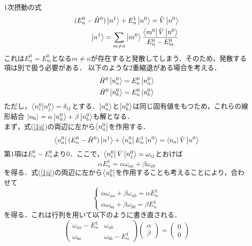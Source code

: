 \documentclass{standalone}
\begin{document}
  1次摂動の式
  \begin{align}
    \label{1ji}
    (E_n^0-\hat{H}^0)\ket{n^1}+E_n^1\ket{n^0}=\hat{V}\ket{n^0}\\
    \ket{n^1}=\sum_{m\ne n}\ket{m^0}\frac{\bra{m^0}\hat{V}\ket{n^0}}{E_n^0-E_m^0}
  \end{align}
  これは$E_n^0=E_m^0$となる$m\ne n$が存在すると発散してしまう．そのため，発散する項は別で扱う必要がある．
  以下のような2重縮退がある場合を考える．
  \begin{align}
    \hat{H}^0\ket{n_a^0}&=E_n^0\ket{n_a^0}\\
    \hat{H}^0\ket{n_b^0}&=E_n^0\ket{n_b^0}
  \end{align}
  ただし，$\braket{n_i^0}{n_j^0}=\delta_{ij}$とする．$\ket{n_a^0}$と$\ket{n_b^0}$は同じ固有値をもつため，これらの線形結合
  $\ket{n_0}=\alpha\ket{n_a^0}+\beta\ket{n_b^0}$も解となる．\\
  まず，式(\ref{1ji})の両辺に左から$\bra{n_a^0}$を作用する．
  \begin{equation}
    \bra{n_a^0}(E_n^0-\hat{H}^0)\ket{n^1}+\bra{n_a^0}E_n^1\ket{n^0}=\bra{n_a}\hat{V}\ket{n^0}
  \end{equation}
  第1項は$E_n^0-E_n^0$より0．ここで，$\bra{n_i^0}\hat{V}\ket{n_j^0}=\omega_{ij}$とおけば
  \begin{equation}
    \alpha E_n^1=\alpha\omega_{aa}+\beta\omega_{ab}
  \end{equation}
  を得る．式(\ref{1ji})の両辺に左から$\bra{n_b^0}$を作用することも考えることにより，合わせて
  \begin{equation}
    \begin{cases}
      \alpha\omega_{aa}+\beta\omega_{ab}=\alpha E_n^1\\
      \alpha\omega_{ba}+\beta\omega_{bb}=\beta E_n^1
    \end{cases}
  \end{equation}
  を得る．これは行列を用いて以下のように書き直される．
  \begin{equation}
    \label{gyouretu}
    \begin{pmatrix}
      \omega_{aa}-E_n^1&\omega_{ab}\\
      \omega_{ba}&\omega_{bb}-E_n^1
    \end{pmatrix}
    \begin{pmatrix}
      \alpha\\
      \beta
    \end{pmatrix}
    =
    \begin{pmatrix}
      0\\0
    \end{pmatrix}
  \end{equation}
\end{document}
